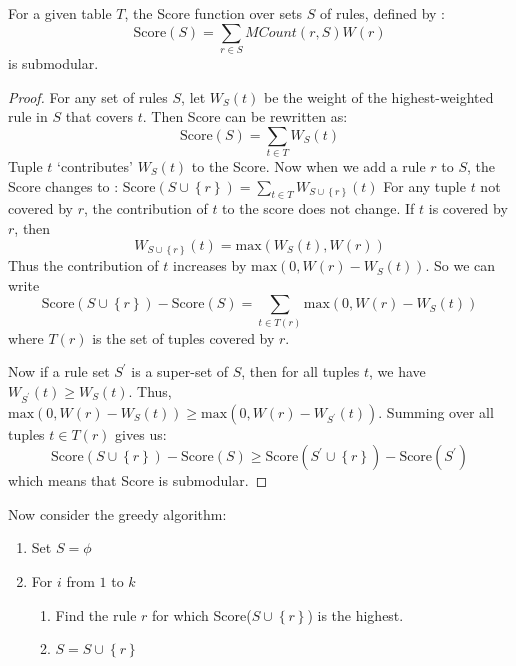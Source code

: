 \begin{lemma}\label{lemma:submodular}
For a given table $T$, the Score function over sets $S$ of rules, defined by :
$$\text{Score}(S) = \sum_{r \in S} MCount(r,S)W(r)$$
is submodular.
\end{lemma}
\begin{proof}
For any set of rules $S$, let $W_{S}(t)$ be the weight of the highest-weighted rule in $S$ that covers $t$. Then Score can be rewritten as:
$$\text{Score}(S) = \sum_{t\in T}W_{S}(t)$$
Tuple $t$ `contributes' $W_{S}(t)$ to the Score. Now when we add a rule $r$ to $S$, the Score changes to :
$\text{Score}(S \cup \left\lbrace r \right\rbrace) = \sum_{t\in T}W_{S \cup \left\lbrace r \right\rbrace}(t)$
For any tuple $t$ not covered by $r$, the contribution of $t$ to the score does not change. If $t$ is covered by $r$, then 
$$W_{S\cup \left\lbrace r \right\rbrace}(t) = \textrm{max}(W_{S}(t), W(r))$$ 
Thus the contribution of $t$ increases by $\textrm{max}(0, W(r) - W_{S}(t))$. So we can write
$$\text{Score}(S \cup \left\lbrace r \right\rbrace) - \text{Score}(S) = \sum_{t \in T(r)} \textrm{max}(0, W(r) - W_{S}(t))$$ where $T(r)$ is the set of tuples covered by $r$.

Now if a rule set $S^{\prime}$ is a super-set of $S$, then for all tuples $t$, we have $W_{S^{\prime}}(t) \geq W_{S}(t)$. Thus,
$\textrm{max}(0, W(r) - W_{S}(t)) \geq \textrm{max}(0, W(r) - W_{S^{\prime}}(t))$. Summing over all tuples $t \in T(r)$ gives us:
$$\text{Score}(S \cup \left\lbrace r \right\rbrace) - \text{Score}(S) \geq \text{Score}(S^{\prime} \cup \left\lbrace r \right\rbrace) - \text{Score}(S^{\prime})$$
which means that Score is submodular.
\end{proof}

Now consider the greedy algorithm:

\begin{framed}
\vspace{-15pt}
\begin{enumerate}
\item Set $S = \phi$
\item For $i$ from $1$ to $k$
\begin{enumerate}
\item Find the rule $r$ for which Score($S \cup \left\lbrace r \right\rbrace$) is the highest.
\item $S = S \cup \left\lbrace r \right\rbrace$
\end{enumerate}
\end{enumerate}
\vspace{-15pt}
\end{framed}

